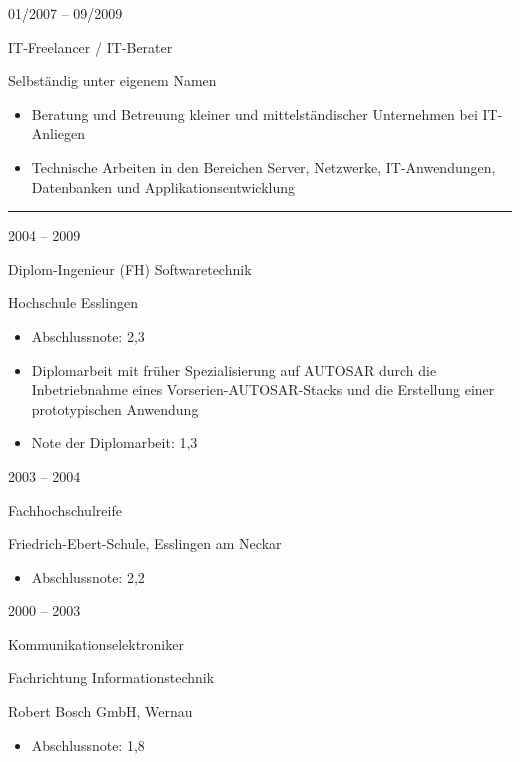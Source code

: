 \documentclass[a4paper,10pt]{article}
\newlength{\cvcolumngapwidth}
\newlength{\cvleftcolumnwidth}
\newlength{\cvrightcolumnwidth}
\newcommand{\cvsectionstyle}[1]{{\normalsize\cvsectionfont\textcolor{cvsectioncolor}{#1}}}
\newcommand{\cvtitlestyle}[1]{{\large\cvtitlefont\textcolor{cvtitlecolor}{#1}}}
\newcommand{\cvdurationstyle}[1]{{\small\cvdurationfont\textcolor{cvdurationcolor}{#1}}}
\newlength{\cvafteritemskipamount}
\newlength{\cvaftersectionskipamount}
\newlength{\cvaftertitleskipamount}
\newlength{\cvparskip}
\newcommand{\cvsection}[1]{
    \begin{minipage}[t]{\cvleftcolumnwidth}
        \raggedleft\cvsectionstyle{#1}
    \end{minipage}%
    \hspace{\cvcolumngapwidth}%
    \begin{minipage}[t]{\cvrightcolumnwidth}
        \textcolor{cvrulecolor}{\rule{\cvrightcolumnwidth}{0.3mm}}
    \end{minipage}

    \vspace{\cvaftersectionskipamount}
}
\newcommand{\cvitem}[2]{
    \begin{minipage}[t]{\cvleftcolumnwidth}
        \raggedleft #1
    \end{minipage}%
    \hspace{\cvcolumngapwidth}%
    \begin{minipage}[t]{\cvrightcolumnwidth}
        \setlength{\parskip}{\cvparskip} #2
    \end{minipage}

    \vspace{\cvafteritemskipamount}
}
\newcommand{\cvtitle}[1]{
    \cvtitlestyle{#1}

    \vspace{\cvaftertitleskipamount}
    \vspace{-\cvparskip}
}
\begin{document}
\cvitem{
    \cvdurationstyle{01/2007 -- 09/2009}
}{
    \cvtitle{IT-Freelancer / IT-Berater}

    Selbständig unter eigenem Namen

    \begin{itemize}[leftmargin=*]
        \item Beratung und Betreuung kleiner und mittelständischer Unternehmen bei IT-Anliegen
        \item Technische Arbeiten in den Bereichen Server, Netzwerke, IT-Anwendungen, Datenbanken und Applikationsentwicklung
    \end{itemize}
}



\cvsection{AUSBILDUNG}

\cvitem{
    \cvdurationstyle{2004 -- 2009}
}{
    \cvtitle{Diplom-Ingenieur (FH) Softwaretechnik}

    Hochschule Esslingen

    \begin{itemize}[leftmargin=*]
        \item Abschlussnote: 2,3
          \item Diplomarbeit mit früher Spezialisierung auf AUTOSAR durch die Inbetriebnahme eines Vorserien-AUTOSAR-Stacks
              und die Erstellung einer prototypischen Anwendung
        \item Note der Diplomarbeit: 1,3
    \end{itemize}
}

\cvitem{
    \cvdurationstyle{2003 -- 2004}
}{
    \cvtitle{Fachhochschulreife}

    Friedrich-Ebert-Schule, Esslingen am Neckar

    \begin{itemize}[leftmargin=*]
        \item Abschlussnote: 2,2
    \end{itemize}
}

\cvitem{
    \cvdurationstyle{2000 -- 2003}
}{
    \cvtitle{Kommunikationselektroniker}

    Fachrichtung Informationstechnik

    Robert Bosch GmbH, Wernau

    \begin{itemize}[leftmargin=*]
        \item Abschlussnote: 1,8
    \end{itemize}
}


\end{document}
